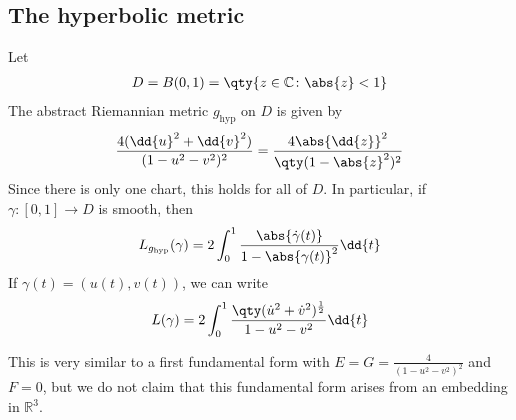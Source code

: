 \subsection{The hyperbolic metric}
\begin{definition}
	Let
	\begin{align*}
		D = B(0,1) = \qty{z \in \mathbb C \colon \abs{z} < 1}
	\end{align*}
	The abstract Riemannian metric $g_{\mathrm{hyp}}$ on $D$ is given by
	\begin{align*}
		\frac{4(\dd{u}^2 + \dd{v}^2)}{(1-u^2-v^2)^2} = \frac{4 \abs{\dd{z}}^2}{\qty(1 - \abs{z}^2)^2}
	\end{align*}
	Since there is only one chart, this holds for all of $D$.
	In particular, if $\gamma \colon [0,1] \to D$ is smooth, then
	\begin{align*}
		L_{g_{\mathrm{hyp}}}(\gamma) = 2 \int_0^1 \frac{\abs{\dot\gamma(t)}}{1 - \abs{\gamma(t)}^2} \dd{t}
	\end{align*}
	If $\gamma(t) = (u(t), v(t))$, we can write
	\begin{align*}
		L(\gamma) = 2 \int_0^1 \frac{\qty(\dot u^2 + \dot v^2)^{\frac{1}{2}}}{1 - u^2 - v^2} \dd{t}
	\end{align*}
\end{definition}
This is very similar to a first fundamental form with $E = G = \frac{4}{(1-u^2-v^2)^2}$ and $F = 0$, but we do not claim that this fundamental form arises from an embedding in $\mathbb R^3$.

